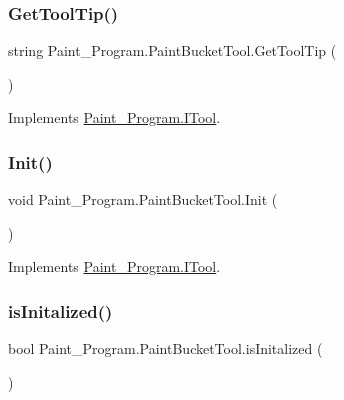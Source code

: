 \subsubsection{\texorpdfstring{Get\+Tool\+Tip()}{GetToolTip()}}
{\footnotesize\ttfamily string Paint\+\_\+\+Program.\+Paint\+Bucket\+Tool.\+Get\+Tool\+Tip (\begin{DoxyParamCaption}{ }\end{DoxyParamCaption})\hspace{0.3cm}{\ttfamily [inline]}}



Implements \mbox{\hyperlink{interface_paint___program_1_1_i_tool_ac11f1591587144b6e74f5767bbf1df56}{Paint\+\_\+\+Program.\+I\+Tool}}.

\mbox{\label{class_paint___program_1_1_paint_bucket_tool_a2de33717bdf3555d97e5e6e962602f85}} 
\subsubsection{\texorpdfstring{Init()}{Init()}}
{\footnotesize\ttfamily void Paint\+\_\+\+Program.\+Paint\+Bucket\+Tool.\+Init (\begin{DoxyParamCaption}{ }\end{DoxyParamCaption})\hspace{0.3cm}{\ttfamily [inline]}}



Implements \mbox{\hyperlink{interface_paint___program_1_1_i_tool_af823123a30fbda34e24e907243241046}{Paint\+\_\+\+Program.\+I\+Tool}}.

\mbox{\label{class_paint___program_1_1_paint_bucket_tool_ad41b8e00b3715186451c6caadc595db8}} 
\subsubsection{\texorpdfstring{is\+Initalized()}{isInitalized()}}
{\footnotesize\ttfamily bool Paint\+\_\+\+Program.\+Paint\+Bucket\+Tool.\+is\+Initalized (\begin{DoxyParamCaption}{ }\end{DoxyParamCaption})\hspace{0.3cm}{\ttfamily [inline]}}



